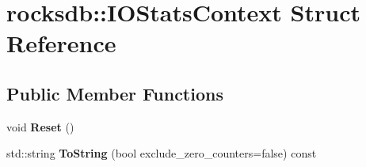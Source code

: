 \hypertarget{structrocksdb_1_1IOStatsContext}{}\section{rocksdb\+:\+:I\+O\+Stats\+Context Struct Reference}
\label{structrocksdb_1_1IOStatsContext}
\subsection*{Public Member Functions}
\begin{DoxyCompactItemize}
\item 
void {\bfseries Reset} ()\hypertarget{structrocksdb_1_1IOStatsContext_a4f0c4e39ab81d594d875d1c276080635}{}\label{structrocksdb_1_1IOStatsContext_a4f0c4e39ab81d594d875d1c276080635}

\item 
std\+::string {\bfseries To\+String} (bool exclude\+\_\+zero\+\_\+counters=false) const\hypertarget{structrocksdb_1_1IOStatsContext_adeba7d64abac158c0371f7f6883ffb5e}{}\label{structrocksdb_1_1IOStatsContext_adeba7d64abac158c0371f7f6883ffb5e}

\end{DoxyCompactItemize}
